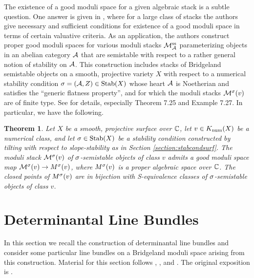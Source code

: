 \documentclass[letterpaper,11pt]{amsart}%
\newtheorem{thm}{Theorem}[section]
\theoremstyle{remark}
\begin{document}
The existence of a good moduli space for a given algebraic stack is a subtle question. One answer is given in \cite{AHLH}, where for a large class of stacks the authors give necessary and sufficient conditions for existence of a good moduli space in terms of certain valuative criteria. As an application, the authors construct proper good moduli spaces for various moduli stacks $\mathcal{M}^{\mathrm{ss}}_{\mathcal{A}}$ parameterizing objects in an abelian category $\mathcal{A}$ that are semistable with respect to a rather general notion of stability on $\mathcal{A}$. This construction includes stacks of Bridgeland semistable objects on a smooth, projective variety $X$ with respect to a numerical stability condition $\sigma = (\mathcal{A}, Z) \in \operatorname{\mathrm{Stab}}(X)$ whose heart $\mathcal{A}$ is Noetherian and satisfies the ``generic flatness property'', and for which the moduli stacks $\mathcal{M}^\sigma(v)$ are of finite type. See \cite[Section 7]{AHLH} for details, especially Theorem 7.25 and Example 7.27. In particular, we have the following.
\begin{thm}\label{gmsexists}
    Let $X$ be a smooth, projective surface over $\mathbb{C}$, let $v \in K_{\mathrm{num}}(X)$ be a numerical class, and let $\sigma \in \operatorname{\mathrm{Stab}}(X)$ be a stability condition constructed by tilting with respect to slope-stability as in Section \ref{section:stabcondsurf}. The moduli stack $\mathcal{M}^\sigma(v)$ of $\sigma$-semistable objects of class $v$ admits a good moduli space map $\mathcal{M}^\sigma(v) \to M^\sigma(v)$, where $M^\sigma(v)$ is a proper algebraic space over $\mathbb{C}$. The closed points of $M^\sigma(v)$ are in bijection with S-equivalence classes of $\sigma$-semistable objects of class $v$.
\end{thm}



\section{Determinantal Line Bundles}
In this section we recall the construction of determinantal line bundles and consider some particular line bundles on a Bridgeland moduli space arising from this construction. Material for this section follows \cite[\href{https://stacks.math.columbia.edu/tag/0FJI}{Tag 0FJI}]{stacks-project}, \cite[\href{https://stacks.math.columbia.edu/tag/0FJW}{Tag 0FJW}]{stacks-project}, and \cite[Section 8.1]{HL}. The original exposition is \cite{KM76}.
\end{document}
